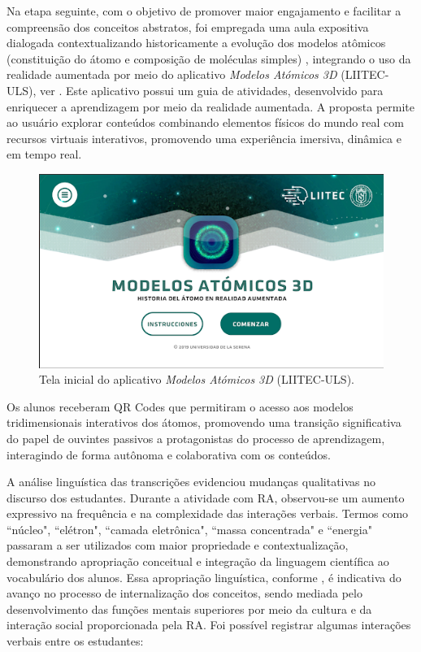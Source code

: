 \documentclass[portuguese]{textolivre}
\begin{document}
Na etapa seguinte, com o objetivo de promover maior engajamento e facilitar a compreensão dos conceitos abstratos, foi empregada uma aula expositiva dialogada contextualizando historicamente a evolução dos modelos atômicos (constituição do átomo e composição de moléculas simples) \cite{brasil2018}, integrando o uso da realidade aumentada por meio do aplicativo \emph{Modelos Atómicos 3D} (LIITEC-ULS), ver . Este aplicativo possui um guia de atividades, desenvolvido para enriquecer a aprendizagem por meio da realidade aumentada. A proposta permite ao usuário explorar conteúdos combinando elementos físicos do mundo real com recursos virtuais interativos, promovendo uma experiência imersiva, dinâmica e em tempo real.

\begin{figure}[htbp]
\centering
\begin{minipage}{0.80\textwidth}
\includegraphics[width =\textwidth]{Imagens/Fig1.png}
\caption{Tela inicial do aplicativo \emph{Modelos Atómicos 3D} (LIITEC-ULS).}
\label{fig-1}
\end{minipage}
\end{figure}

Os alunos receberam QR Codes que permitiram o acesso aos modelos tridimensionais interativos dos átomos, promovendo uma transição significativa do papel de ouvintes passivos a protagonistas do processo de aprendizagem, interagindo de forma autônoma e colaborativa com os conteúdos.

A análise linguística das transcrições evidenciou mudanças qualitativas no discurso dos estudantes. Durante a atividade com RA, observou-se um aumento expressivo na frequência e na complexidade das interações verbais. Termos como ``núcleo", ``elétron", ``camada eletrônica", ``massa concentrada" e ``energia" passaram a ser utilizados com maior propriedade e contextualização, demonstrando apropriação conceitual e integração da linguagem científica ao vocabulário dos alunos. Essa apropriação linguística, conforme \textcite{vygotsky2000}, é indicativa do avanço no processo de internalização dos conceitos, sendo mediada pelo desenvolvimento das funções mentais superiores por meio da cultura e da interação social proporcionada pela RA. Foi possível registrar algumas interações verbais entre os estudantes:
\end{document}
